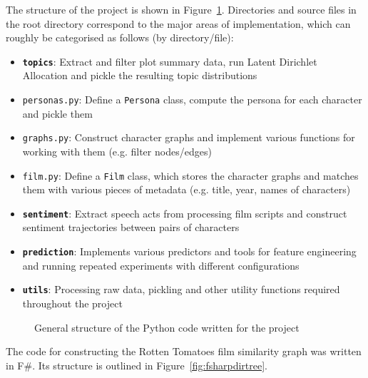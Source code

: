 \documentclass[bsc,frontabs,singlespacing,parskip]{infthesis} %
\begin{document}
The structure of the project is shown in Figure~\ref{fig:dirtree}. Directories and source files in the root directory correspond to the major areas of implementation, which can roughly be categorised as follows (by directory/file):
\begin{itemize}
	\item \texttt{\textbf{topics}}:  Extract and filter plot summary data, run Latent Dirichlet Allocation and pickle the resulting topic distributions
	\item \texttt{personas.py}: Define a \texttt{Persona} class, compute the persona for each character and pickle them
	\item \texttt{graphs.py}: Construct character graphs and implement various functions for working with them (e.g. filter nodes/edges)
	\item \texttt{film.py}: Define a \texttt{Film} class, which stores the character graphs and matches them with various pieces of metadata (e.g. title, year, names of characters)
	\item \texttt{\textbf{sentiment}}: Extract speech acts from processing film scripts and construct sentiment trajectories between pairs of characters
	\item \texttt{\textbf{prediction}}: Implements various predictors and tools for feature engineering and running repeated experiments with different configurations
	\item \texttt{\textbf{utils}}: Processing raw data, pickling and other utility functions required throughout the project
\end{itemize}

\hspace{.1in}
\begin{figure}[ht!]
\caption{General structure of the Python code written for the project}
\label{fig:dirtree}
\end{figure}

The code for constructing the Rotten Tomatoes film similarity graph was written in F\#. Its structure is outlined in Figure~\ref{fig:fsharpdirtree}.
\end{document}
